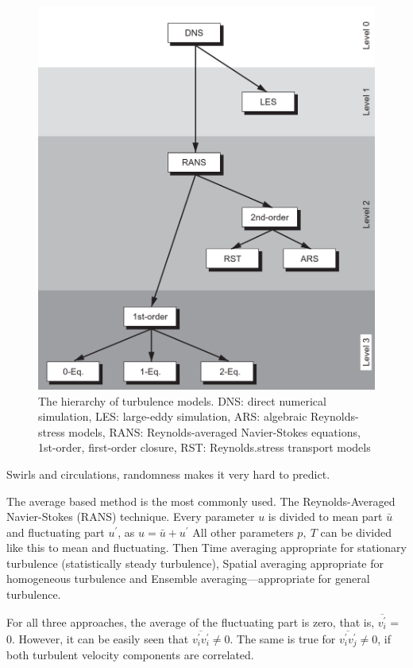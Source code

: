 \documentclass{article}
\begin{document}
\begin{figure}
\centering
\includegraphics[scale=0.25]{turbulence models.PNG}
\caption{The hierarchy of turbulence models. DNS: direct numerical simulation, LES: large-eddy simulation, ARS: algebraic
Reynolds-stress models, RANS: Reynolds-averaged Navier-Stokes equations, 1st-order, first-order closure, RST: Reynolds.stress transport models}
\end{figure}


Swirls and circulations, randomness makes it very hard to predict. 


The average based method is the most commonly used. The Reynolds-Averaged Navier-Stokes (RANS) technique. Every parameter $u$ is divided to mean part $\bar{u}$ and fluctuating part $ u^\prime $, as $u = \bar{u} + u^\prime$ All other parameters $p,\ T$ can be divided like this to mean and fluctuating. Then Time averaging appropriate for stationary turbulence (statistically steady turbulence), Spatial averaging appropriate for homogeneous turbulence and Ensemble averaging—appropriate for general turbulence.

For all three approaches, the average of the fluctuating part is zero, that is, $\overline{v_i ^\prime}$ = 0.
However, it can be easily seen that $\overline{v_i ^\prime v_i ^\prime} \neq 0$. The same is true for $\overline{v_i ^\prime v_j ^\prime} \neq 0$, if both turbulent velocity components are correlated.
\end{document}

